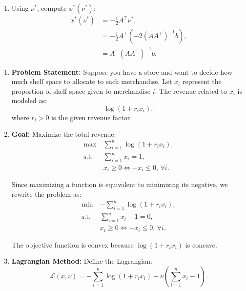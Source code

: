 \begin{example}
\begin{enumerate}
        \item Using \(\nu^*\), compute \(x^*(\nu^*)\):
        \begin{align*}
            x^*(\nu^*) &= -\frac{1}{2} A^\top \nu^*, \\
            &= -\frac{1}{2} A^\top \left(-2 (A A^\top)^{-1} b\right), \\
            &= A^\top (A A^\top)^{-1} b.
        \end{align*}
    \end{enumerate}
\end{example}

\begin{example}
    \begin{enumerate}
        \item \textbf{Problem Statement:} 
        Suppose you have a store and want to decide how much shelf space to allocate to each merchandise. Let \(x_i\) represent the proportion of shelf space given to merchandise \(i\). The revenue related to \(x_i\) is modeled as:
        \[
        \log(1 + r_i x_i),
        \]
        where \(r_i > 0\) is the given revenue factor.
    
        \item \textbf{Goal:}
        Maximize the total revenue:
        \[
        \begin{aligned}
            \max \ & \sum_{i=1}^n \log(1 + r_i x_i), \\
            \text{s.t.} \ & \sum_{i=1}^n x_i = 1, \\
            & x_i \geq 0 \iff -x_i \leq 0, \, \forall i.
        \end{aligned}
        \]

        Since maximizing a function is equivalent to minimizing its negative, we rewrite the problem as:
       \[
        \begin{aligned}
            \min \ & -\sum_{i=1}^n \log(1 + r_i x_i), \\
            \text{s.t.} \ & \sum_{i=1}^n x_i - 1 = 0, \\
            & x_i \geq 0 \iff -x_i \leq 0, \, \forall i.
        \end{aligned}
        \]

        The objective function is convex because \(\log(1 + r_i x_i)\) is concave.
    
        \item \textbf{Lagrangian Method:}
        Define the Lagrangian:
        \[
        \mathcal{L}(x, \nu) = -\sum_{i=1}^n \log(1 + r_i x_i) + \nu \left( \sum_{i=1}^n x_i - 1 \right).
        \]
    

\end{enumerate}
\end{example}
